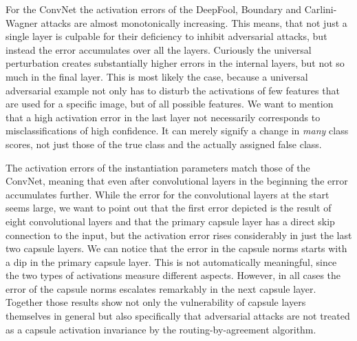 For the ConvNet the activation errors of the DeepFool, Boundary and Carlini-Wagner attacks are almost monotonically increasing.
This means, that not just a single layer is culpable for their deficiency to inhibit adversarial attacks, but instead the error accumulates over all the layers.
Curiously the universal perturbation creates substantially higher errors in the internal layers, but not so much in the final layer.
This is most likely the case, because a universal adversarial example not only has to disturb the activations of few features that are used for a specific image, but of all possible features. 
We want to mention that a high activation error in the last layer not necessarily corresponds to misclassifications of high confidence.
It can merely signify a change in \emph{many} class scores, not just those of the true class and the actually assigned false class.

The activation errors of the instantiation parameters match those of the ConvNet, meaning that even after convolutional layers in the beginning the error accumulates further.
While the error for the convolutional layers at the start seems large, we want to point out that the first error depicted is the result of eight convolutional layers and that the primary capsule layer has a direct skip connection to the input, but the activation error rises considerably in just the last two capsule layers.
We can notice that the error in the capsule norms starts with a dip in the primary capsule layer.
This is not automatically meaningful, since the two types of activations measure different aspects.
However, in all cases the error of the capsule norms escalates remarkably in the next capsule layer.
Together those results show not only the vulnerability of capsule layers themselves in general but also specifically that adversarial attacks are not treated as a capsule activation invariance by the routing-by-agreement algorithm.
